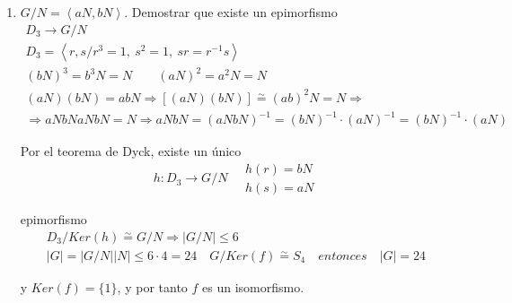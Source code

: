 \documentclass{article}
\begin{document}
\begin{enumerate}[(1)]
\item $G/N=\left\langle aN,bN\right\rangle$. Demostrar que existe un epimorfismo
\begin{gather*}
D_3\longrightarrow G/N\\
D_3=\left\langle r,s/r^3=1,\:s^2=1,\:sr=r^{-1}s\right\rangle \\
(bN)^3=b^3N=N\qquad (aN)^2=a^2N=N\\
(aN)(bN)=abN\Rightarrow \left[(aN)(bN)\right]\overset{\sim}{=} (ab)^2N=N\Rightarrow \\
\Rightarrow aNbNaNbN=N\Rightarrow aNbN=(aNbN)^{-1}=(bN)^{-1}\cdot (aN)^{-1}=(bN)^{-1}\cdot (aN)
\end{gather*}

Por el teorema de Dyck, existe un único
\begin{equation*}
h:D_3\longrightarrow G/N\quad \left.\begin{array}{c}
h(r)=bN\\
h(s)=aN
\end{array}\right.
\end{equation*}

epimorfismo
\begin{gather*}
D_3/Ker(h)\overset{\sim}{=} G/N\Rightarrow |G/N|\leq 6 \\
|G|=|G/N||N|\leq 6\cdot 4=24 \quad G/Ker(f)\overset{\sim}{=} S_4\quad entonces\quad |G|=24
\end{gather*}

y $Ker(f)=\{1\}$, y por tanto $f$ es un isomorfismo.
\end{enumerate}
\end{document}
